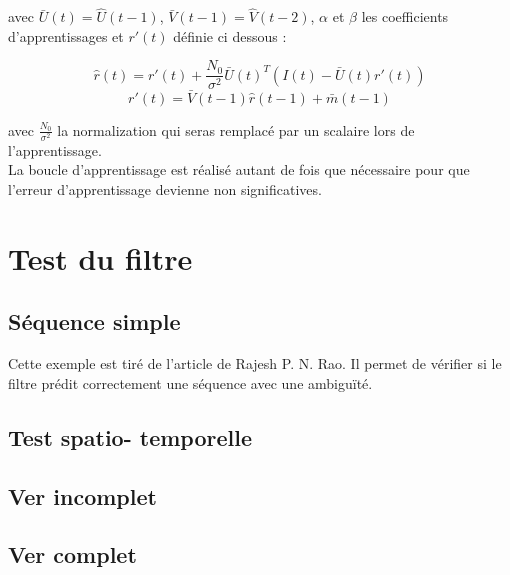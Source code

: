 avec $\bar{U}(t) = \hat{U}(t-1)$, $\bar{V}(t-1) = \hat{V}(t-2)$, $\alpha$ et $\beta$
les coefficients d'apprentissages et $r'(t)$ définie ci dessous :

\begin{equation}
   \label{eqn:def_r_hat}
   \hat{r}(t) = r'(t) + \frac{N_0}{\sigma^2}\bar{U}(t)^T(I(t)-\bar{U}(t)r'(t))
\end{equation}
\begin{equation}
   \label{eqn:def_r_prime}
   r'(t) =  \bar{V}(t-1)\hat{r}(t-1) + \bar{m}(t-1)
\end{equation}

avec $\frac{N_0}{\sigma^2}$ la normalization qui seras remplacé par un scalaire lors
de l'apprentissage.\\


La boucle d'apprentissage est réalisé autant de fois que nécessaire pour que
l'erreur d'apprentissage devienne non significatives.



\section{Test du filtre} %
\label{sec:Test du filtre}

\subsection{Séquence simple} %
\label{sub:Sequence simple}

Cette exemple est tiré de l'article de Rajesh P. N. Rao. Il permet
de vérifier si le filtre prédit correctement une séquence avec une ambiguïté.


\subsection{Test spatio- temporelle} %
\label{sub:Test spatio-temporelle}


\subsection{Ver incomplet} %
\label{sub:Ver incomplet}


\subsection{Ver complet} %
\label{sub:Ver complet}




